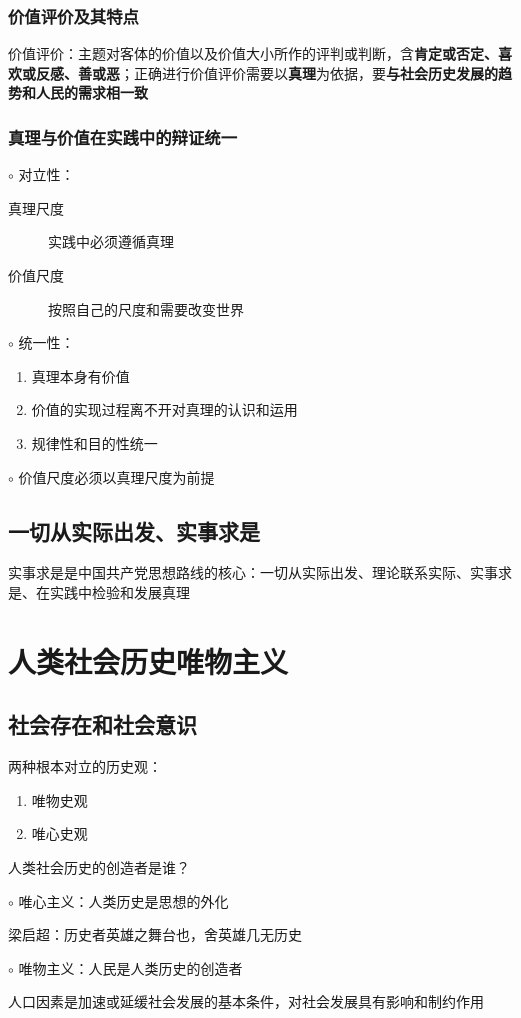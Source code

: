\subsubsection*{价值评价及其特点}%
\label{subsub:价值评价及其特点}
价值评价：主题对客体的价值以及价值大小所作的评判或判断，含\textbf{肯定或否定、喜欢或反感、善或恶}；正确进行价值评价需要以\textbf{真理}为依据，要\textbf{与社会历史发展的趋势和人民的需求相一致}
\subsubsection*{真理与价值在实践中的辩证统一}%
\label{subsub:真理与价值在实践中的辩证统一}
$\circ$ 对立性：
\begin{description}
    \item[真理尺度] 实践中必须遵循真理
    \item [价值尺度] 按照自己的尺度和需要改变世界
\end{description}
$\circ$ 统一性：
\begin{enumerate}
    \item 真理本身有价值
    \item 价值的实现过程离不开对真理的认识和运用
    \item 规律性和目的性统一
\end{enumerate}
$\circ$ 价值尺度必须以真理尺度为前提
\subsection{一切从实际出发、实事求是}%
\label{sub:一切从实际出发、实事求是}
\begin{notation}
    实事求是是中国共产党思想路线的核心：一切从实际出发、理论联系实际、实事求是、在实践中检验和发展真理
\end{notation}
\section{人类社会历史唯物主义}%
\label{sec:人类社会历史唯物主义}
\subsection{社会存在和社会意识}%
\label{sub:社会存在和社会意识}
\begin{notation}
    两种根本对立的历史观：
    \begin{enumerate}
        \item 唯物史观
        \item 唯心史观
    \end{enumerate}
\end{notation}
\begin{question}
    人类社会历史的创造者是谁？
\end{question}
$\circ$ 唯心主义：人类历史是思想的外化
\begin{eg}
    梁启超：历史者英雄之舞台也，舍英雄几无历史
\end{eg}
$\circ$ 唯物主义：人民是人类历史的创造者
\begin{notation}
    人口因素是加速或延缓社会发展的基本条件，对社会发展具有影响和制约作用
\end{notation}
